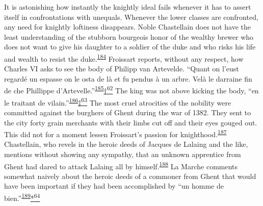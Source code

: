It is astonishing how instantly the knightly ideal fails whenever it has
to assert itself in confrontations with unequals. Whenever the lower
classes are confronted, any need for knightly loftiness disappears.
Noble Chastellain does not have the least understanding of the stubborn
bourgeois honor of the wealthy brewer who does not want to give his
daughter to a soldier of the duke and who risks his life and wealth to
resist the
duke.\textsuperscript{\protect\hypertarget{10_Chapter_Three__THE_HEROIC_DREAM.xhtmlux5cux23id_1568}{\protect\hyperlink{23_NOTES.xhtmlux5cux23id_1569}{184}}}
Froissart reports, without any respect, how Charles VI asks to see the
body of Philipp van Artevelde. ``Quant on l'eust regardé un espasse on
le osta de là et fu pendus à un arbre. Velà le darraine fin de che
Phillippe
d'Artevelle.''\textsuperscript{\protect\hypertarget{10_Chapter_Three__THE_HEROIC_DREAM.xhtmlux5cux23id_1566}{\protect\hyperlink{23_NOTES.xhtmlux5cux23id_1567}{185}}}\protect\hypertarget{10_Chapter_Three__THE_HEROIC_DREAM.xhtmlux5cux23id_2911}{\protect\hyperlink{23_NOTES.xhtmlux5cux23id_2912}{†\textsuperscript{62}}}
The king was not above kicking the body, ``en le traitant de
vilain.''\textsuperscript{\protect\hypertarget{10_Chapter_Three__THE_HEROIC_DREAM.xhtmlux5cux23id_1564}{\protect\hyperlink{23_NOTES.xhtmlux5cux23id_1565}{186}}}\protect\hypertarget{10_Chapter_Three__THE_HEROIC_DREAM.xhtmlux5cux23id_2913}{\protect\hyperlink{23_NOTES.xhtmlux5cux23id_2914}{‡\textsuperscript{63}}}
The most cruel atrocities of the nobility were committed against the
burghers of Ghent during the war of 1382. They sent to the city forty
grain merchants with their limbs cut
\protect\hypertarget{10_Chapter_Three__THE_HEROIC_DREAM.xhtmlux5cux23page_116}{}{}off
and their eyes gouged out. This did not for a moment lessen Froissart's
passion for
knighthood.\textsuperscript{\protect\hypertarget{10_Chapter_Three__THE_HEROIC_DREAM.xhtmlux5cux23id_1562}{\protect\hyperlink{23_NOTES.xhtmlux5cux23id_1563}{187}}}
Chastellain, who revels in the heroic deeds of Jacques de Lalaing and
the like, mentions without showing any sympathy, that an unknown
apprentice from Ghent had dared to attack Lalaing all by
himself.\textsuperscript{\protect\hypertarget{10_Chapter_Three__THE_HEROIC_DREAM.xhtmlux5cux23id_1560}{\protect\hyperlink{23_NOTES.xhtmlux5cux23id_1561}{188}}}
La Marche comments somewhat naively about the heroic deeds of a commoner
from Ghent that would have been important if they had been accomplished
by ``un homme de
bien.''\textsuperscript{\protect\hypertarget{10_Chapter_Three__THE_HEROIC_DREAM.xhtmlux5cux23id_1559}{\protect\hyperlink{23_NOTES.xhtmlux5cux23page_411}{189}}}\protect\hypertarget{10_Chapter_Three__THE_HEROIC_DREAM.xhtmlux5cux23id_2915}{\protect\hyperlink{23_NOTES.xhtmlux5cux23id_2916}{*\textsuperscript{64}}}

